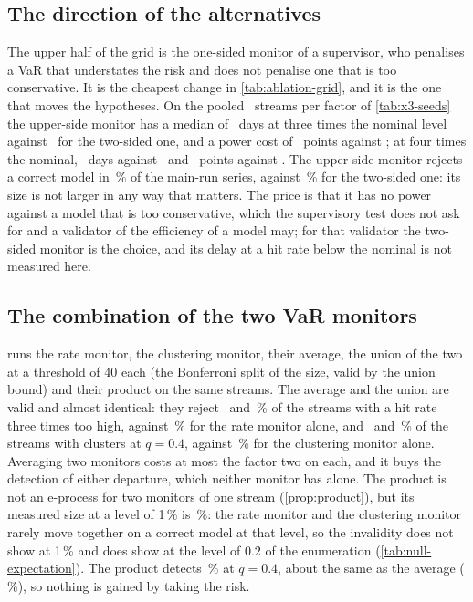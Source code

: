 

\subsection{The direction of the alternatives}
\label{sec:ablation-direction}

The upper half of the grid is the one-sided monitor of a supervisor, who penalises a VaR that understates the risk and does not penalise one that is too conservative. It is the cheapest change in \cref{tab:ablation-grid}, and it is the one that moves the hypotheses. On the pooled \nSeedsPooledN\ streams per factor of \cref{tab:x3-seeds} the upper-side monitor has a median of \nSeedsUpThreeMed\ days at three times the nominal level against \nSeedsThreeMed\ for the two-sided one, and a power cost of \nSeedsUpThreeCost\ points against \nSeedsThreeCost;
at four times the nominal, \nSeedsUpFourMed\ days against \nSeedsFourMed\ and \nSeedsUpFourCost\ points against \nSeedsFourCost. The upper-side monitor rejects a correct model in \nNullSizeEUp\,\% of the main-run series, against \nNullSizeE\,\% for the two-sided one: its size is not larger in any way that matters. The price is that it has no power against a model that is too conservative, which the supervisory test does not ask for and a validator of the efficiency of a model may; for that validator the two-sided monitor is the choice, and its delay at a hit rate below the nominal is not measured here.

\subsection{The combination of the two VaR monitors}
\label{sec:ablation-battery}

 runs the rate monitor, the clustering monitor, their average, the union of the two at a threshold of 40 each (the Bonferroni split of the size, valid by the union bound) and their product on the same streams. The average and the union are valid and almost identical: they reject \nAbBatThreeAverage\ and \nAbBatThreeUnion\,\% of the streams with a hit rate three times too high, against \nAbBatThreeRate\,\% for the rate monitor alone, and \nAbBatClFourAverage\ and \nAbBatClFourUnion\,\% of the streams with clusters at $q=0.4$, against
\nAbBatClFourCluster\,\% for the clustering monitor alone. Averaging two monitors costs at most the factor two on each, and it buys the detection of either departure, which neither monitor has alone. The product is not an e-process for two monitors of one stream (\cref{prop:product}), but its measured size at a level of 1\,\% is \nAbBatNullProduct\,\%: the rate monitor and the clustering monitor rarely move together on a correct model at that level, so the invalidity does not show at 1\,\% and does show at the level of
$0.2$ of the enumeration (\cref{tab:null-expectation}). The product detects \nAbBatClFourProduct\,\% at $q=0.4$, about the same as the average (\nAbBatClFourAverage\,\%), so nothing is gained by taking the risk.

